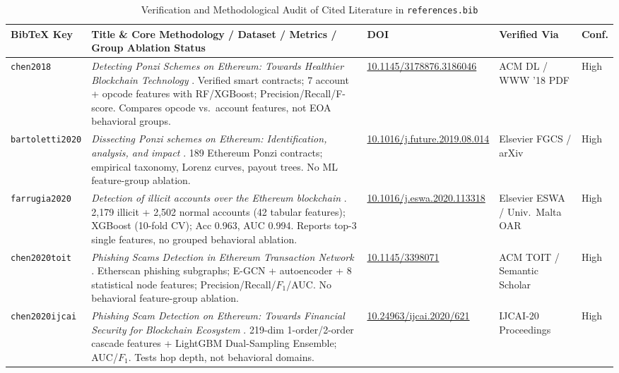 \documentclass[conference]{IEEEtran}
\begin{document}
\begin{table}[!t]
\centering
\caption{Verification and Methodological Audit of Cited Literature in \texttt{references.bib}}
\label{tab:verification}
\footnotesize
\begin{tabularx}{\textwidth}{l X l l l}
\toprule
\textbf{BibTeX Key} & \textbf{Title \& Core Methodology / Dataset / Metrics / Group Ablation Status} & \textbf{DOI} & \textbf{Verified Via} & \textbf{Conf.} \\
\midrule
\texttt{chen2018} & \emph{Detecting Ponzi Schemes on Ethereum: Towards Healthier Blockchain Technology} \cite{chen2018}. Verified smart contracts; 7 account + opcode features with RF/XGBoost; Precision/Recall/F-score. Compares opcode vs.\ account features, not EOA behavioral groups. & \href{https://doi.org/10.1145/3178876.3186046}{10.1145/3178876.3186046} & ACM DL / WWW '18 PDF & High \\
\addlinespace[3pt]
\texttt{bartoletti2020} & \emph{Dissecting Ponzi schemes on Ethereum: Identification, analysis, and impact} \cite{bartoletti2020}. 189 Ethereum Ponzi contracts; empirical taxonomy, Lorenz curves, payout trees. No ML feature-group ablation. & \href{https://doi.org/10.1016/j.future.2019.08.014}{10.1016/j.future.2019.08.014} & Elsevier FGCS / arXiv & High \\
\addlinespace[3pt]
\texttt{farrugia2020} & \emph{Detection of illicit accounts over the Ethereum blockchain} \cite{farrugia2020}. 2,179 illicit + 2,502 normal accounts (42 tabular features); XGBoost (10-fold CV); Acc 0.963, AUC 0.994. Reports top-3 single features, no grouped behavioral ablation. & \href{https://doi.org/10.1016/j.eswa.2020.113318}{10.1016/j.eswa.2020.113318} & Elsevier ESWA / Univ.\ Malta OAR & High \\
\addlinespace[3pt]
\texttt{chen2020toit} & \emph{Phishing Scams Detection in Ethereum Transaction Network} \cite{chen2020toit}. Etherscan phishing subgraphs; E-GCN + autoencoder + 8 statistical node features; Precision/Recall/$F_1$/AUC. No behavioral feature-group ablation. & \href{https://doi.org/10.1145/3398071}{10.1145/3398071} & ACM TOIT / Semantic Scholar & High \\
\addlinespace[3pt]
\texttt{chen2020ijcai} & \emph{Phishing Scam Detection on Ethereum: Towards Financial Security for Blockchain Ecosystem} \cite{chen2020ijcai}. 219-dim 1-order/2-order cascade features + LightGBM Dual-Sampling Ensemble; AUC/$F_1$. Tests hop depth, not behavioral domains. & \href{https://doi.org/10.24963/ijcai.2020/621}{10.24963/ijcai.2020/621} & IJCAI-20 Proceedings & High \\

\end{tabularx}
\end{table}
\end{document}
